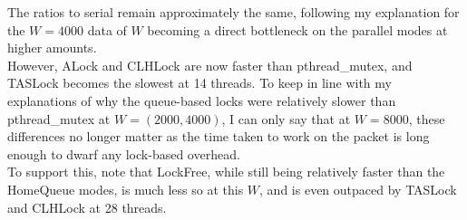 \documentclass{article}
\begin{document}
\begin{adjustwidth}{-2cm}{-2cm}
The ratios to serial remain approximately the same, following my explanation for the $W=4000$ data of $W$ becoming a direct bottleneck on the parallel modes at higher amounts.\\
However, ALock and CLHLock are now faster than pthread\_mutex, and TASLock becomes the slowest at 14 threads. To keep in line with my explanations of why the queue-based locks were relatively slower than pthread\_mutex at $W=(2000,4000)$, I can only say that at $W=8000$, these differences no longer matter as the time taken to work on the packet is long enough to dwarf any lock-based overhead.\\
To support this, note that LockFree, while still being relatively faster than the HomeQueue modes, is much less so at this $W$, and is even outpaced by TASLock and CLHLock at 28 threads.


\end{adjustwidth}
\end{document}
